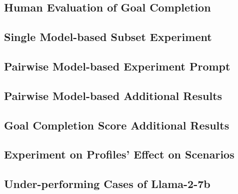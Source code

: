 \subsection{Human Evaluation of Goal Completion}


\subsection{Single Model-based Subset Experiment}\label{app:subset}


\subsection{Pairwise Model-based Experiment Prompt}\label{app:heter_exp_prompt}


\subsection{Pairwise Model-based Additional Results}\label{app:heter_exp_res}


\subsection{Goal Completion Score Additional Results}\label{app:goal_add_res}


\subsection{Experiment on Profiles' Effect on Scenarios}\label{app:profile_analysis}


\subsection{Under-performing Cases of Llama-2-7b}\label{app:underperforming}



